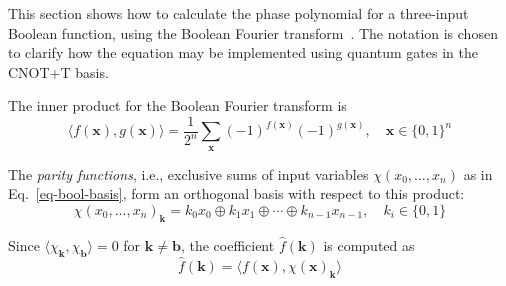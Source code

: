 \documentclass[a4paper]{article}
\begin{document}
\vspace{0.3cm}

This section shows how to calculate the phase polynomial for a three-input Boolean function, using the Boolean Fourier transform~\cite{bib-odonnell}. The notation is chosen to clarify how the equation may be implemented using quantum gates in the CNOT+T basis. 

\vspace{0.3cm}

The inner product for the Boolean Fourier transform is
\begin{equation}
  \label{eq-inner-prod}
  \langle f(\mathbf{x}) , g(\mathbf{x}) \rangle = \frac{1}{2^n} \sum_{\mathbf{x}} (-1)^{f(\mathbf{x})} (-1)^{g(\mathbf{x})}, \quad \mathbf{x} \in \{0,1\}^n
\end{equation}

The {\it parity functions}, i.e., exclusive sums of input variables $\chi(x_0,\ldots,x_n)$ as in Eq.~\ref{eq-bool-basis}, form an orthogonal basis with respect to this product:
\begin{equation}
  \label{eq-bool-basis}
  \chi(x_0,\ldots,x_n)_{\mathbf{k}} = k_0 x_0 \oplus k_1 x_1 \oplus \cdots \oplus k_{n-1} x_{n-1},\quad k_i \in \{0,1\}
\end{equation}

\vspace{0.2cm}

Since $\langle \chi_{\mathbf{k}}, \chi_{\mathbf{b}} \rangle = 0$ for $\mathbf{k} \neq \mathbf{b}$, the coefficient $\hat{f}(\mathbf{k})$ is computed as
\begin{equation}
  \label{eq-fhat-prod}
  \hat{f}(\mathbf{k}) = \langle f(\mathbf{x}), \chi(\mathbf{x})_{\mathbf{k}} \rangle
\end{equation}

\vspace{0.2cm}
\end{document}
